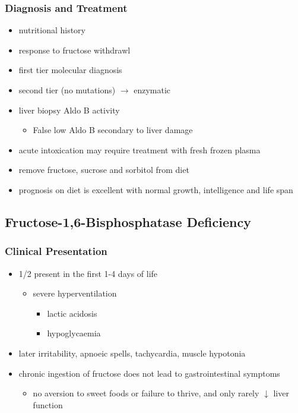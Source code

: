 \documentclass{scrartcl}
\begin{document}
\subsubsection{Diagnosis and Treatment}
\label{sec:org0cd97ef}
\begin{itemize}
\item nutritional history
\item response to fructose withdrawl
\item first tier molecular diagnosis
\item second tier (no mutations) \(\to\) enzymatic
\item liver biopsy Aldo B activity
\begin{itemize}
\item False low Aldo B secondary to liver damage
\end{itemize}

\item acute intoxication may require treatment with fresh frozen plasma

\item remove fructose, sucrose and sorbitol from diet
\item prognosis on diet is excellent with normal growth,
intelligence and life span
\end{itemize}

\subsection{Fructose-1,6-Bisphosphatase Deficiency}
\label{sec:org93640e6}
\subsubsection{Clinical Presentation}
\label{sec:org6e35ba7}
\begin{itemize}
\item 1/2 present in the first 1-4 days of life
\begin{itemize}
\item severe hyperventilation
\begin{itemize}
\item lactic acidosis
\item hypoglycaemia
\end{itemize}
\end{itemize}
\item later irritability, apnoeic spells, tachycardia, muscle hypotonia
\item chronic ingestion of fructose does not lead to gastrointestinal symptoms
\begin{itemize}
\item no aversion to sweet foods or failure to thrive, and only rarely \(\downarrow\) liver function
\end{itemize}
\end{itemize}
\end{document}
